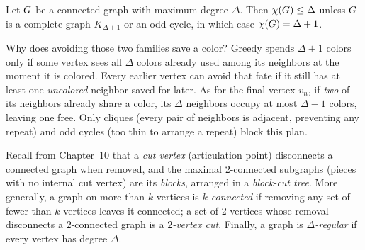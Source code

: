\begin{theorem}[Brooks, 1941]
\label{ch28:thm-brooks}
Let $G$ be a connected graph with maximum degree $\Delta$. Then
$\chi(G)\le\Delta$ unless $G$ is a complete graph $K_{\Delta+1}$ or an odd
cycle, in which case $\chi(G)=\Delta+1$.
\end{theorem}

\begin{intuitionbox}
Why does avoiding those two families save a color? Greedy spends
$\Delta+1$ colors only if some vertex sees all $\Delta$ colors already used among its
neighbors at the moment it is colored. Every earlier vertex can avoid that fate if it still has at least one \emph{uncolored} neighbor saved for later. As for the final vertex $v_n$, if \emph{two} of its neighbors already share a color, its $\Delta$ neighbors occupy at most $\Delta-1$ colors, leaving one free. Only cliques (every pair of neighbors is adjacent, preventing any repeat) and odd cycles (too thin to arrange a repeat) block this plan.
\end{intuitionbox}

Recall from Chapter~10 that a \emph{cut vertex} (articulation point) disconnects a connected graph when removed, and the maximal $2$-connected subgraphs (pieces with no internal cut vertex) are its \emph{blocks}, arranged in a \emph{block-cut tree}. More generally, a graph on more than $k$ vertices is \emph{$k$-connected} if removing any set of fewer than $k$ vertices leaves it connected; a set of $2$ vertices whose removal disconnects a $2$-connected graph is a \emph{$2$-vertex cut}. Finally, a graph is \emph{$\Delta$-regular} if every vertex has degree $\Delta$.

